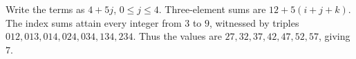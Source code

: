 Write the terms as $4+5j$, $0\le j\le4$. Three-element sums are $12+5(i+j+k)$. The index sums attain every integer from $3$ to $9$, witnessed by triples $012,013,014,024,034,134,234$. Thus the values are $27,32,37,42,47,52,57$, giving $\boxed7$.
